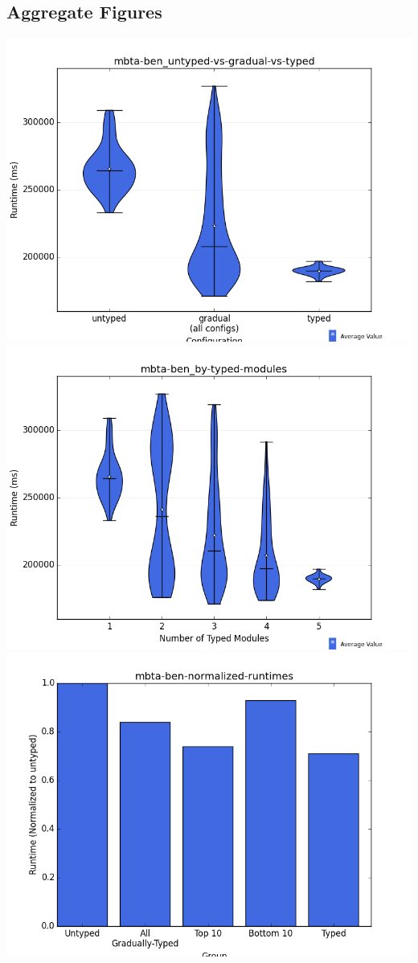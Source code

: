 \documentclass{article}
\begin{document}
\subsection{Aggregate Figures}
\includegraphics[width=\textwidth]{mbta-ben_untyped-vs-gradual-vs-typed-violin.png}
\includegraphics[width=\textwidth]{mbta-ben_by-typed-modules-violin.png}
\includegraphics[width=\textwidth]{mbta-ben-normalized-runtimes-bar.png}
\end{document}
